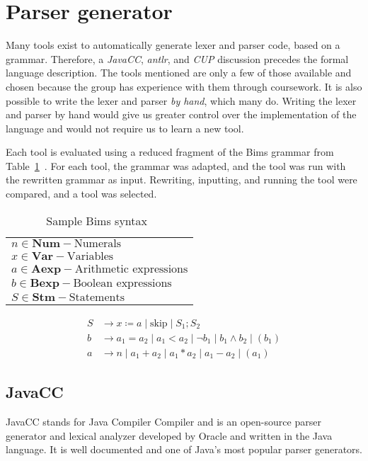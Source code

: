 \section{Parser generator}\label{sec:parsergenerator}
Many tools exist to automatically generate lexer and parser code, based on a grammar. Therefore, a \textit{JavaCC}, \textit{\gls{antlr}}, and \textit{CUP} discussion precedes the formal language description. The tools mentioned are only a few of those available and chosen because the group has experience with them through coursework. It is also possible to write the lexer and parser \textit{by hand}, which many do. Writing the lexer and parser by hand would give us greater control over the implementation of the language and would not require us to learn a new tool.

Each tool is evaluated using a reduced fragment of the Bims grammar from Table~\ref{tab:bimsgrammar}~\cite{Huttel2010}. For each tool, the grammar was adapted, and the tool was run with the rewritten grammar as input. Rewriting, inputting, and running the tool were compared, and a tool was selected.



\begin{table}[htb!]
  \centering
  \begin{tabular}{l}
    $n \in \textbf{Num} - \text{Numerals}$                \\
    $x \in \textbf{Var} - \text{Variables}$               \\
    $a \in \textbf{Aexp} - \text{Arithmetic expressions}$ \\
    $b \in \textbf{Bexp} - \text{Boolean expressions}$    \\
    $S \in \textbf{Stm} - \text{Statements}$              \\
  \end{tabular}
  \begin{align*}
    S & \rightarrow x \coloneqq a \mid \text{skip} \mid S_1;S_2                          \\
    b & \rightarrow a_1 = a_2 \mid a_1 < a_2 \mid \neg b_1 \mid b_1 \land b_2 \mid (b_1) \\
    a & \rightarrow n \mid a_1 + a_2 \mid a_1 * a_2 \mid a_1 - a_2 \mid (a_1)
  \end{align*}
  \caption{Sample Bims syntax~\cite{Huttel2010}}
  \label{tab:bimsgrammar}
\end{table}


\subsection{JavaCC}
JavaCC stands for Java Compiler Compiler and is an open-source parser generator and lexical analyzer developed by Oracle and written in the Java language. It is well documented and one of Java's most popular parser generators.

